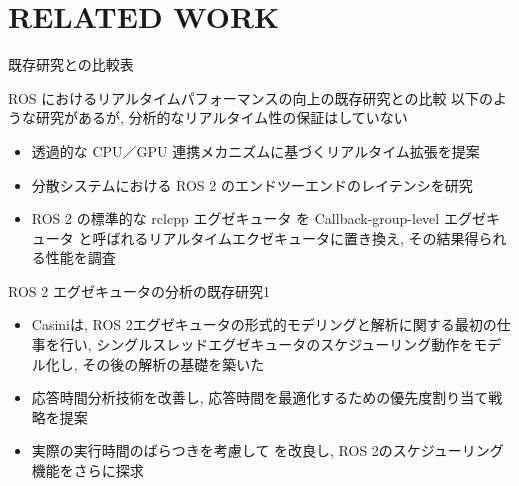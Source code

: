 
\section{RELATED WORK}
\label{sec: related work}


\begin{frame}{既存研究との比較表}
\end{frame}


\begin{frame}{ROS におけるリアルタイムパフォーマンスの向上の既存研究との比較}
    以下のような研究があるが, 分析的なリアルタイム性の保証はしていない
    \begin{itemize}
        \item 透過的な CPU／GPU 連携メカニズムに基づくリアルタイム拡張を提案 \cite{suzuki2018real}
        \item 分散システムにおける ROS 2 のエンドツーエンドのレイテンシを研究 \cite{kronauer2021latency}
        \item ROS 2 の標準的な rclcpp エグゼキュータ を Callback-group-level エグゼキュータ と呼ばれるリアルタイムエクゼキュータに置き換え, その結果得られる性能を調査 \cite{yang2020exploring}
    \end{itemize}
\end{frame}

\begin{frame}{ROS 2 エグゼキュータの分析の既存研究1}
    \begin{itemize}
        \item Casiniは, ROS 2エグゼキュータの形式的モデリングと解析に関する最初の仕事を行い, シングルスレッドエグゼキュータのスケジューリング動作をモデル化し, その後の解析の基礎を築いた \cite{park2021ros2}
        \item 応答時間分析技術を改善し, 応答時間を最適化するための優先度割り当て戦略を提案 \cite{tang2020response}
        \item 実際の実行時間のばらつきを考慮して \cite{park2021ros2} を改良し, ROS 2のスケジューリング機能をさらに探求 \cite{blass2021ros}
    \end{itemize}
\end{frame}

